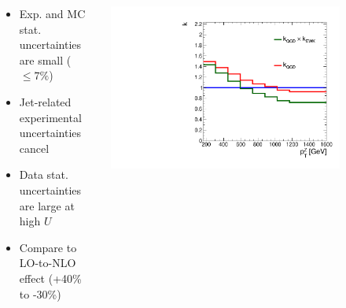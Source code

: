 \documentclass[aspectratio=169,xcolor=dvipsnames,,table,compress]{beamer}
\begin{document}
\begin{frame}
\begin{columns}
\begin{column}{0.3\textwidth}
    \end{column}
  \end{columns}
  \begin{columns}[T]
    \begin{column}{0.7\textwidth}
      \begin{itemize}
        \item Exp. and MC stat. uncertainties are small ($\leq 7\%$)
        \item Jet-related experimental uncertainties cancel 
        \item Data stat. uncertainties are large at high $U$
        \pause 
        \item Compare to LO-to-NLO effect (+40\% to -30\%)
      \end{itemize}
    \end{column}
    \begin{column}{0.3\textwidth}
      \vspace{-6.5mm}
      \includegraphics[width=0.8\textwidth]{../figures/monotop/kfactors/zcorr_ptv.pdf}
    \end{column}
  \end{columns}
\end{frame}
 
\end{document}

